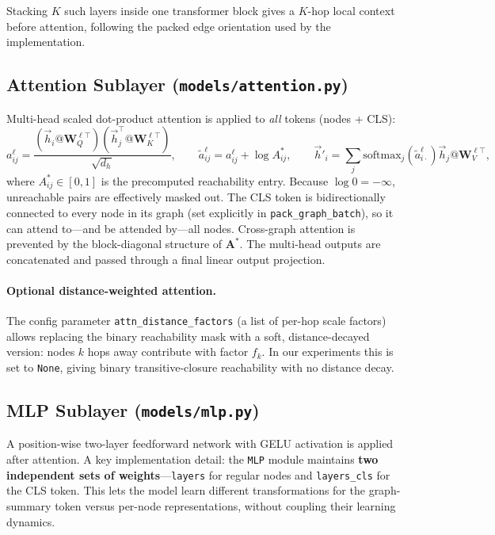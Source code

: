 \documentclass[11pt]{article}
\begin{document}
Stacking $K$ such layers inside one transformer block gives a $K$-hop local context before attention, following the packed edge orientation used by the implementation.

\subsection{Attention Sublayer (\texttt{models/attention.py})}

Multi-head scaled dot-product attention is applied to \emph{all} tokens (nodes + CLS):
\[
a^\ell_{ij} = \frac{\left(\vec{h}_i @ \mathbf{W}_Q^{\ell\top}\right)\left(\vec{h}_j^\top @ \mathbf{W}_K^{\ell\top}\right)}{\sqrt{d_h}},
\qquad
\tilde{a}^\ell_{ij} = a^\ell_{ij} + \log A^*_{ij},
\qquad
\vec{h}'_i = \sum_j \mathrm{softmax}_j(\tilde{a}^\ell_{i\cdot}) \vec{h}_j @ \mathbf{W}_V^{\ell\top},
\]
where $A^*_{ij} \in [0,1]$ is the precomputed reachability entry. Because $\log 0 = -\infty$, unreachable pairs are effectively masked out. The CLS token is bidirectionally connected to every node in its graph (set explicitly in \texttt{pack\_graph\_batch}), so it can attend to---and be attended by---all nodes. Cross-graph attention is prevented by the block-diagonal structure of $\mathbf{A}^*$.
The multi-head outputs are concatenated and passed through a final linear output projection.

\paragraph{Optional distance-weighted attention.}
The config parameter \texttt{attn\_distance\_factors} (a list of per-hop scale factors) allows replacing the binary reachability mask with a soft, distance-decayed version: nodes $k$ hops away contribute with factor $f_k$. In our experiments this is set to \texttt{None}, giving binary transitive-closure reachability with no distance decay.

\subsection{MLP Sublayer (\texttt{models/mlp.py})}

A position-wise two-layer feedforward network with GELU activation is applied after attention. A key implementation detail: the \texttt{MLP} module maintains \textbf{two independent sets of weights}---\texttt{layers} for regular nodes and \texttt{layers\_cls} for the CLS token. This lets the model learn different transformations for the graph-summary token versus per-node representations, without coupling their learning dynamics.
\end{document}
